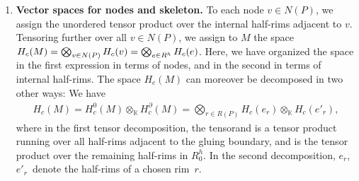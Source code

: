 \documentclass[10pt,a4paper]{amsart}
\DeclareMathOperator{\Hom}{Hom}
\DeclareMathOperator{\K}{\mathbb{K}}
\DeclareMathOperator{\calc}{\mathcal{C}}
\numberwithin{equation}{section}
\theoremstyle{definition}
\begin{document}
\begin{enumerate}
 If $r$ is a rim coming from a defect edge, the procedure that assigns a vector space is very similar. Note however that here, we have an additional object $Y \in \calc$ labeling $r$. The rim $r$ has only two neighboring branches, a left and a right one, and both orientations are compatible. For concreteness, we assume that the orientation of the left one induces the orientation of the half-rim $e$ (which is possibly different from the orientation of the defect edge in $\Gamma$). Then, we set $H_c(e) = \Hom_{\calc}\left(\mathbbm{1}, x_{\ell} \otimes Y^{\varepsilon} \otimes x_r^*\right)$, where $x_{\ell}$ decorates the left branch, $x_r$ the right one and the sign $\varepsilon$ is positive precisely if the orientation of the edge in $E(\Gamma)$ defining $r$ agrees with the one of the half-edge $e$.
 \item \label{itemSpaces} \textbf{Vector spaces for nodes and skeleton.} To each node $v \in N(P)$, we assign the unordered tensor product  over the internal half-rims adjacent to $v$. Tensoring further over all $v \in N(P)$, we assign to $M$ the space $H_c(M) = \smash{\bigotimes_{v \in N(P)}H_c(v)} = \smash{\bigotimes_{e \in R^h}H_c(e)}$. Here, we have organized the space in the first expression in terms of nodes, and in the second in terms of internal half-rims. The space $H_c(M)$ can moreover be decomposed in two other ways: We have
 \begin{align}
 \label{eqDec}
 H_c(M) = H_c^0(M) \otimes_{\K} H_c^{\partial}(M) = \bigotimes_{r \in R(P)} H_c(e_r) \otimes_{\K} H_c(e'_r),
 \end{align}
 where in the first tensor decomposition, the tensorand  is a tensor product running over all half-rims adjacent to the gluing boundary, and  is the tensor product over the remaining half-rims in $R_0^h$. In the second decomposition, $e_r$,~$e'_r$~denote the half-rims of a chosen rim~$r$.


\end{enumerate}
\end{document}
